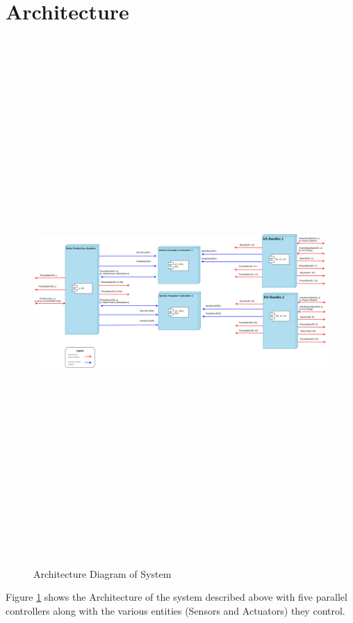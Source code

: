 \documentclass[a4paper,12pt]{article}
\begin{document}
\section{Architecture}
\begin{figure}[ht]
\centering
    \includegraphics[angle=90, width=15cm,height=20cm]{Architecture.jpg}
  \caption{Architecture Diagram of System}
  \label{fig:arch1}
\end{figure}
Figure \ref{fig:arch1} shows the Architecture of the system described above with five parallel controllers along with the various entities (Sensors and Actuators) they control.
\end{document}
